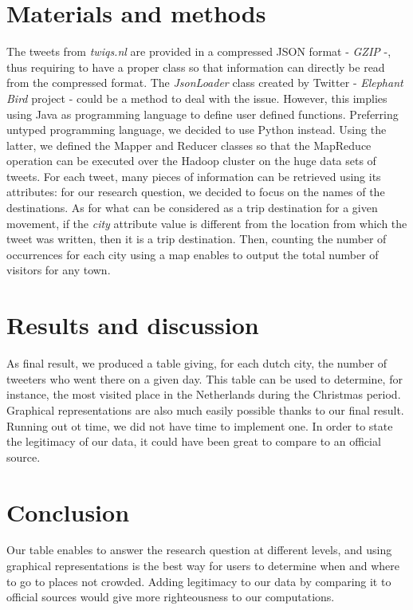 \documentclass[conference]{doc}
\begin{document}
	\section{Materials and methods}
		The tweets from \emph{twiqs.nl} are provided in a compressed JSON format -
		\emph{GZIP} -, thus requiring to have a proper class so that information can
		directly be read from the compressed format. The \emph{JsonLoader}
		class created by Twitter - \emph{Elephant Bird} project - could be a method to deal with the
		issue. However, this implies using Java as programming language to define user
		defined functions. Preferring untyped programming language, we decided to use
		Python instead. Using the latter, we defined the Mapper and Reducer classes so
		that the MapReduce operation can be executed over the Hadoop cluster on the
		huge data sets of tweets. For each tweet, many pieces of information can be
		retrieved using its attributes: for our research question, we decided to focus
		on the names of the destinations. As for what can be considered as a
		trip destination for a given movement, if the \emph{city} attribute value is
		different from the location from which the tweet was written, then it is a
		trip destination. Then, counting the number of occurrences for each city using
		a map enables to output the total number of visitors for any town.
		
	\section{Results and discussion}
		As final result, we produced a table giving, for each dutch city, the number
		of tweeters who went there on a given day. This table can be used to
		determine, for instance, the most visited place in the Netherlands during the
		Christmas period. Graphical representations are also much easily possible
		thanks to our final result. Running out ot time, we did not have time to
		implement one. In order to state the legitimacy of our data, it could have
		been great to compare to an official source.


	\section{Conclusion}
		Our table enables to answer the research question at different levels, and
		using graphical representations is the best way for users to determine when
		and where to go to places not crowded. Adding legitimacy to our data by
		comparing it to official sources would give more righteousness to our computations.
\end{document}
